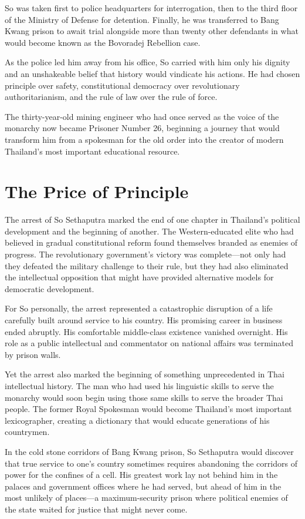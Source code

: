 \documentclass[
  Letterpaper,
]{scrbook}
\begin{document}
So was taken first to police headquarters for interrogation, then to the
third floor of the Ministry of Defense for detention. Finally, he was
transferred to Bang Kwang prison to await trial alongside more than
twenty other defendants in what would become known as the Bovoradej
Rebellion case.

As the police led him away from his office, So carried with him only his
dignity and an unshakeable belief that history would vindicate his
actions. He had chosen principle over safety, constitutional democracy
over revolutionary authoritarianism, and the rule of law over the rule
of force.

The thirty-year-old mining engineer who had once served as the voice of
the monarchy now became Prisoner Number 26, beginning a journey that
would transform him from a spokesman for the old order into the creator
of modern Thailand's most important educational resource.

\section{The Price of Principle}\label{the-price-of-principle}

The arrest of So Sethaputra marked the end of one chapter in Thailand's
political development and the beginning of another. The Western-educated
elite who had believed in gradual constitutional reform found themselves
branded as enemies of progress. The revolutionary government's victory
was complete---not only had they defeated the military challenge to
their rule, but they had also eliminated the intellectual opposition
that might have provided alternative models for democratic development.

For So personally, the arrest represented a catastrophic disruption of a
life carefully built around service to his country. His promising career
in business ended abruptly. His comfortable middle-class existence
vanished overnight. His role as a public intellectual and commentator on
national affairs was terminated by prison walls.

Yet the arrest also marked the beginning of something unprecedented in
Thai intellectual history. The man who had used his linguistic skills to
serve the monarchy would soon begin using those same skills to serve the
broader Thai people. The former Royal Spokesman would become Thailand's
most important lexicographer, creating a dictionary that would educate
generations of his countrymen.

In the cold stone corridors of Bang Kwang prison, So Sethaputra would
discover that true service to one's country sometimes requires
abandoning the corridors of power for the confines of a cell. His
greatest work lay not behind him in the palaces and government offices
where he had served, but ahead of him in the most unlikely of places---a
maximum-security prison where political enemies of the state waited for
justice that might never come.
\end{document}
